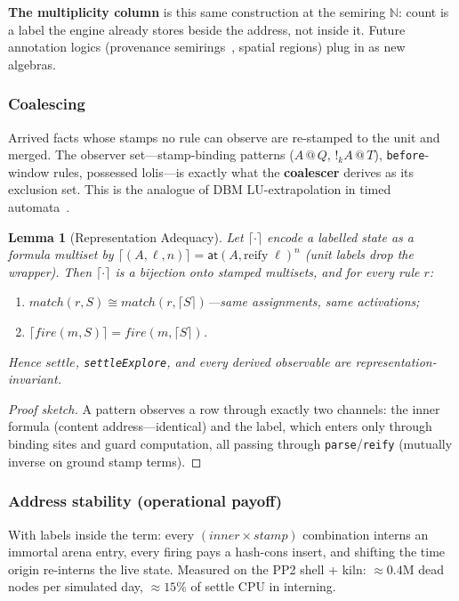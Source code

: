 \documentclass[11pt]{article}
\makeatletter
\newcommand{\gbang}[1]{{!}_{#1}}                 %
\newcommand{\NN}{\mathbb{N}}                     %
\newcommand{\stmp}[2]{#1\mathbin{@}#2}           %
\newcommand{\settle}{\mathit{settle}}
\newcommand{\enc}[1]{\lceil #1 \rceil}          %
\newtheorem{lemma}[theorem]{Lemma}
\theoremstyle{definition}
\theoremstyle{remark}
\makeatother
\begin{document}
\textbf{The multiplicity column} is this same construction at the semiring $\NN$:
count is a label the engine already stores beside the address, not inside it.
Future annotation logics (provenance semirings~\cite{GreenKarvounarakisTannen2007},
spatial regions) plug in as new algebras.

\subsubsection*{Coalescing}

Arrived facts whose stamps no rule can observe are re-stamped to the unit and
merged.  The observer set---stamp-binding patterns ($\stmp{A}{Q}$,
$\gbang{k} \stmp{A}{T}$), \texttt{before}-window rules, possessed
lolis---is exactly what the \textbf{coalescer} derives as its exclusion set.  This
is the analogue of DBM LU-extrapolation in timed
automata~\cite{BengtssonYi2004}.

\begin{lemma}[Representation Adequacy]
\label{lem:rep-adequacy}
Let $\enc{\cdot}$ encode a labelled state as a formula multiset by
$\enc{(A, \ell, n)} = \mathsf{at}(A, \mathrm{reify}\;\ell)^n$ (unit labels drop
the wrapper).  Then $\enc{\cdot}$ is a bijection onto stamped multisets, and for
every rule $r$:
\begin{enumerate}
\item $\mathit{match}(r, S) \cong \mathit{match}(r, \enc{S})$---same assignments,
  same activations;
\item $\enc{\mathit{fire}(m, S)} = \mathit{fire}(m, \enc{S})$.
\end{enumerate}
Hence $\settle$, \texttt{settleExplore}, and every derived observable are
representation-invariant.
\end{lemma}
\begin{proof}[Proof sketch]
A pattern observes a row through exactly two channels: the inner formula
(content address---identical) and the label, which enters only through binding
sites and guard computation, all passing through \texttt{parse}/\texttt{reify}
(mutually inverse on ground stamp terms).
\end{proof}

\subsubsection*{Address stability (operational payoff)}

With labels inside the term: every $(\mathit{inner} \times \mathit{stamp})$
combination interns an immortal arena entry, every firing pays a hash-cons insert,
and shifting the time origin re-interns the live state.  Measured on the PP2 shell
+ kiln: $\approx 0.4$M dead nodes per simulated day, $\approx 15\%$ of settle CPU
in interning.
\end{document}
